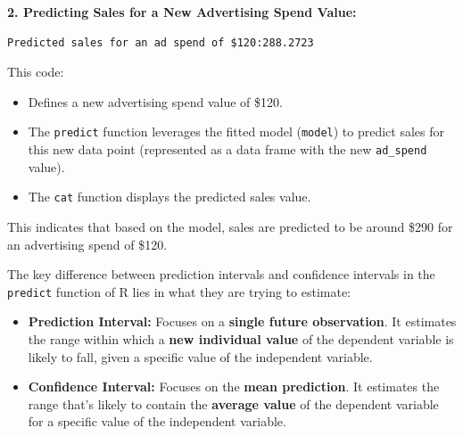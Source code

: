 \documentclass[
  letterpaper,
  paper =a4,
  twoside,
  openright,
  headsepline,
  footsepline,
  listof = totocnumbered,
  chapterprefix = true,
  firstiscover,
  parskip = full*]{scrbook}
\newenvironment{Shaded}{\begin{snugshade}}{\end{snugshade}}
\newcommand{\AttributeTok}[1]{\textcolor[rgb]{0.40,0.45,0.13}{#1}}
\newcommand{\CommentTok}[1]{\textcolor[rgb]{0.37,0.37,0.37}{#1}}
\newcommand{\DecValTok}[1]{\textcolor[rgb]{0.68,0.00,0.00}{#1}}
\newcommand{\FunctionTok}[1]{\textcolor[rgb]{0.28,0.35,0.67}{#1}}
\newcommand{\NormalTok}[1]{\textcolor[rgb]{0.00,0.23,0.31}{#1}}
\newcommand{\OtherTok}[1]{\textcolor[rgb]{0.00,0.23,0.31}{#1}}
\newcommand{\StringTok}[1]{\textcolor[rgb]{0.13,0.47,0.30}{#1}}
\begin{document}
\textbf{2. Predicting Sales for a New Advertising Spend Value:}

\begin{Shaded}
\end{Shaded}

\begin{verbatim}
Predicted sales for an ad spend of $120:288.2723
\end{verbatim}

This code:

\begin{itemize}
\item
  Defines a new advertising spend value of \$120.
\item
  The \texttt{predict} function leverages the fitted model
  (\texttt{model}) to predict sales for this new data point (represented
  as a data frame with the new \texttt{ad\_spend} value).
\item
  The \texttt{cat} function displays the predicted sales value.
\end{itemize}

This indicates that based on the model, sales are predicted to be around
\$290 for an advertising spend of \$120.

The key difference between prediction intervals and confidence intervals
in the \texttt{predict} function of R lies in what they are trying to
estimate:

\begin{itemize}
\item
  \textbf{Prediction Interval:} Focuses on a \textbf{single future
  observation}. It estimates the range within which a \textbf{new
  individual value} of the dependent variable is likely to fall, given a
  specific value of the independent variable.
\item
  \textbf{Confidence Interval:} Focuses on the \textbf{mean prediction}.
  It estimates the range that's likely to contain the \textbf{average
  value} of the dependent variable for a specific value of the
  independent variable.
\end{itemize}
\end{document}
